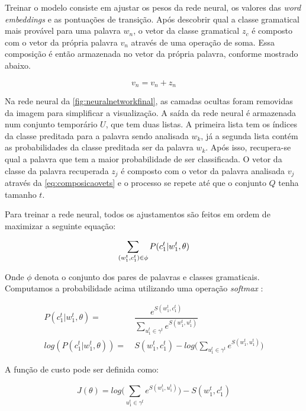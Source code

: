 Treinar o modelo consiste em ajustar os pesos da rede neural, os valores das \textit{word embeddings} e as pontuações de transição. Após descobrir qual a classe gramatical mais provável para uma palavra $w_n$, o vetor da classe gramatical $z_c$ é composto com o vetor da própria palavra $v_n$ através de uma operação de soma. Essa composição é então armazenada no vetor da própria palavra, conforme mostrado abaixo. 

\begin{equation} \label{eq:composicaovets}
v_n = v_n + z_n
\end{equation}

Na rede neural da \autoref{fig:neuralnetworkfinal}, as camadas ocultas foram removidas da imagem para simplificar a visualização. A saída da rede neural é armazenada num conjunto temporário $U$, que tem duas listas. A primeira lista tem os índices da classe preditada para a palavra sendo analisada $w_k$, já a segunda lista contém as probabilidades da classe preditada ser da palavra $w_k$. Após isso, recupera-se qual a palavra que tem a maior probabilidade de ser classificada. O vetor da classe da palavra recuperada $z_j$ é composto com o vetor da palavra analisada $v_j$ através da \autoref{eq:composicaovets} e o processo se repete até que o conjunto $Q$ tenha tamanho $t$.

Para treinar a rede neural, todos os ajustamentos são feitos em ordem de maximizar a seguinte equação:

\begin{equation}
\sum\limits_{(w_1^t,c_1^t) \in \phi} P(c_1^t|w_1^t,\theta) \nonumber \\
\end{equation}

Onde $\phi$ denota o conjunto dos pares de palavras e classes gramaticais. Computamos a probabilidade acima utilizando uma operação \textit{softmax} \cite{Bengio-et-al-2015-Book}:

\begin{align}
P(c_1^t|w_1^t,\theta) = &\ \dfrac{e^{S(w_1^t, c_1^t)}}{\sum\limits_{u_1^t \in \gamma^t} e^{S(w_1^t, u_1^t)}} \nonumber \nonumber \\
log(P(c_1^t|w_1^t,\theta)) = &\ S(w_1^t, c_1^t) - log\Bigg(\sum\limits_{u_1^t \in \gamma^t} e^{S(w_1^t, u_1^t)} \Bigg) \nonumber
\end{align}

A função de custo pode ser definida como:

\begin{equation} \label{eq:costfunctionfinalnn}
J(\theta) = log\Bigg(\sum\limits_{u_1^t \in \gamma^t} e^{S(w_1^t, u_1^t)} \Bigg) - S(w_1^t, c_1^t)
\end{equation}

